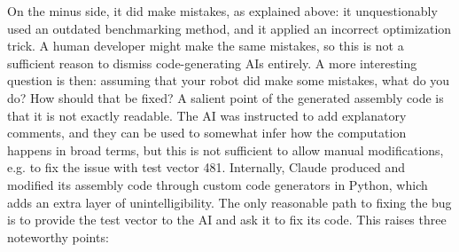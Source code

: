 \documentclass{llncs}
\begin{document}
On the minus side, it did make mistakes, as explained above: it
unquestionably used an outdated benchmarking method, and it applied an
incorrect optimization trick. A human developer might make the same
mistakes, so this is not a sufficient reason to dismiss code-generating
AIs entirely. A more interesting question is then: assuming that your
robot did make some mistakes, what do you do? How should that be fixed?
A salient point of the generated assembly code is that it is not exactly
readable. The AI was instructed to add explanatory comments, and they
can be used to somewhat infer how the computation happens in broad
terms, but this is not sufficient to allow manual modifications, e.g. to
fix the issue with test vector 481. Internally, Claude produced and
modified its assembly code through custom code generators in Python,
which adds an extra layer of unintelligibility. The only reasonable path
to fixing the bug is to provide the test vector to the AI and ask it to
fix its code. This raises three noteworthy points:
\end{document}
